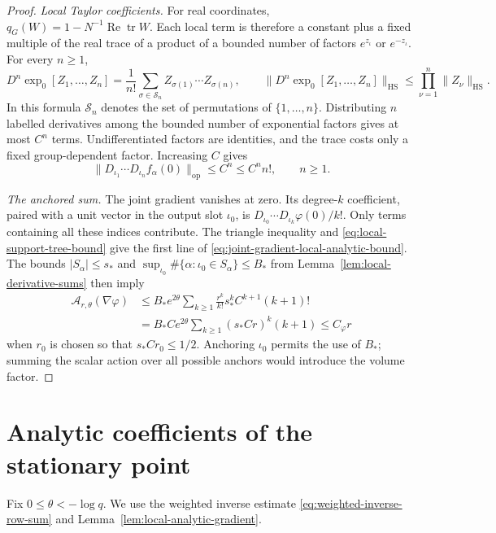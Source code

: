 \documentclass[10pt,reqno]{amsart}
\theoremstyle{definition}
\theoremstyle{remark}
\numberwithin{equation}{section}
\numberwithin{figure}{section}
\DeclareMathOperator{\tr}{tr}
\begin{document}
\begin{proof}
\emph{Local Taylor coefficients.} For real coordinates,
$q_G(W)=1-N^{-1}\operatorname{Re}\tr W$. Each local term is
therefore a constant plus a fixed multiple of the real trace of a
product of a bounded number of factors $e^{z_\iota}$ or
$e^{-z_\iota}$. For every $n\ge1$,
\begin{equation}\label{eq:exponential-derivatives-at-zero-all-orders}
D^n\exp_0[Z_1,\ldots,Z_n]
=\frac1{n!}\sum_{\sigma\in\mathcal S_n}
Z_{\sigma(1)}\cdots Z_{\sigma(n)},\qquad
\|D^n\exp_0[Z_1,\ldots,Z_n]\|_{\mathrm{HS}}
\le\prod_{\nu=1}^n\|Z_\nu\|_{\mathrm{HS}}.
\end{equation}
In this formula $\mathcal S_n$ denotes the set of permutations of
$\{1,\ldots,n\}$. Distributing $n$ labelled derivatives among the
bounded number of exponential factors gives at most $C^n$ terms.
Undifferentiated factors are identities, and the trace costs only a
fixed group-dependent factor. Increasing $C$ gives
\begin{equation}\label{eq:local-action-analytic-derivative-bound}
\|D_{\iota_1}\cdots D_{\iota_n}f_\alpha(0)\|_{\mathrm{op}}
\le C^n\le C^n n!,\qquad n\ge1.
\end{equation}

\emph{The anchored sum.} The joint gradient vanishes at zero.
Its degree-$k$ coefficient, paired with a unit vector in the output
slot $\iota_0$, is $D_{\iota_0}\cdots D_{\iota_k}\varphi(0)/k!$.
Only terms containing all these indices contribute. The triangle
inequality and \eqref{eq:local-support-tree-bound} give the first
line of \eqref{eq:joint-gradient-local-analytic-bound}.
The bounds $|S_\alpha|\le s_*$ and
$\sup_{\iota_0}\#\{\alpha:\iota_0\in S_\alpha\}\le B_*$ from
Lemma~\ref{lem:local-derivative-sums} then imply
\begin{equation}\label{eq:joint-gradient-analytic-series-calculation}
\begin{aligned}
\mathcal A_{r,\theta}(\nabla\varphi)
&\le B_*e^{2\theta}\sum_{k\ge1}
\frac{r^k}{k!}s_*^k C^{k+1}(k+1)!\\
&=B_*Ce^{2\theta}\sum_{k\ge1}(s_*Cr)^k(k+1)
\le C_\varphi r
\end{aligned}
\end{equation}
when $r_0$ is chosen so that $s_*Cr_0\le1/2$.
Anchoring $\iota_0$ permits the use of $B_*$; summing the scalar
action over all possible anchors would introduce the volume factor.
\end{proof}


\section{Analytic coefficients of the stationary point}\label{sec:stationary-analytic-coefficients}
Fix $0\le\theta<-\log q$. We use the weighted inverse estimate
\eqref{eq:weighted-inverse-row-sum} and
Lemma~\ref{lem:local-analytic-gradient}.
\end{document}
